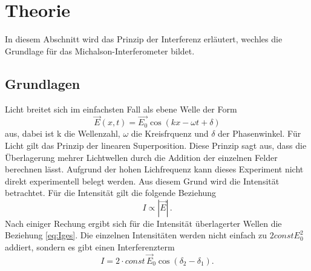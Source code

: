 \section{Theorie}
\label{sec:theorie}

In diesem Abschnitt wird das Prinzip der Interferenz erläutert, wechles die Grundlage für das Michalson-Interferometer bildet.

\subsection{Grundlagen}

Licht breitet sich im einfachsten Fall als ebene Welle der Form 
\begin{equation}
    \vec{E}(x,t) = \vec{E_0} \cos{(kx - \omega t + \delta)}
    \label{eq:ebenewellen}
\end{equation}
aus, dabei ist k die Wellenzahl, $\omega$ die Kreisfrquenz und $\delta$ der Phasenwinkel. Für Licht gilt das Prinzip der linearen Superposition. Diese Prinzip sagt aus, dass die Überlagerung mehrer Lichtwellen durch die Addition der einzelnen Felder berechnen lässt.
Aufgrund der hohen Lichfrequenz kann dieses Experiment nicht direkt experimentell belegt werden. Aus diesem Grund wird die Intensität betrachtet. Für die Intensität gilt die folgende Beziehung 
\begin{equation*}
    I \propto |\vec{E}| \, .
\end{equation*}
Nach einiger Rechung ergibt sich für die Intensität überlagerter Wellen die Beziehung \eqref{eq:Iges}. Die einzelnen Intensitäten werden nicht einfach zu $2 const E_{0}^{2}$ addiert, sondern es gibt einen Interferenzterm
\begin{equation*}
    I = 2 \cdot const \, \vec{E}_0 \cos{(\delta_2 - \delta_1)}.
\end{equation*}
